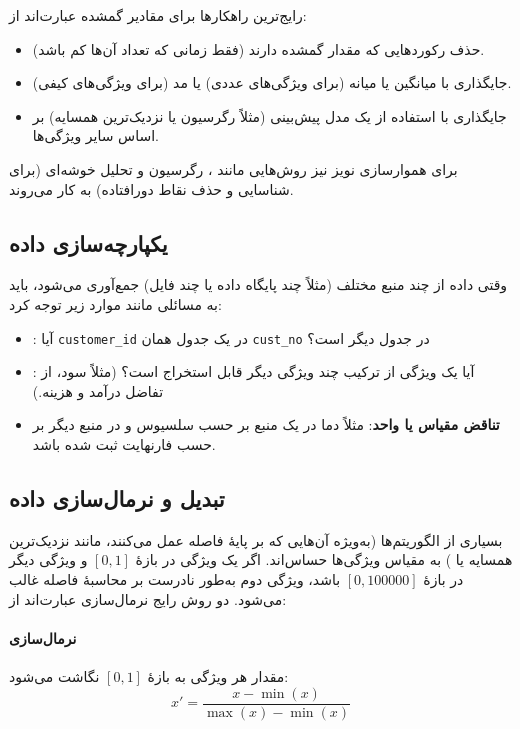 رایج‌ترین راهکارها برای مقادیر گمشده عبارت‌اند از:

\begin{itemize}
    \item حذف رکوردهایی که مقدار گمشده دارند (فقط زمانی که تعداد آن‌ها کم باشد).
    \item جایگذاری با میانگین یا میانه (برای ویژگی‌های عددی) یا مد (برای
          ویژگی‌های کیفی).
    \item جایگذاری با استفاده از یک مدل پیش‌بینی (مثلاً رگرسیون یا نزدیک‌ترین
          همسایه) بر اساس سایر ویژگی‌ها.
\end{itemize}

برای هموارسازی نویز نیز روش‌هایی مانند ،
رگرسیون و تحلیل خوشه‌ای (برای شناسایی و حذف نقاط دورافتاده) به کار می‌روند.

\subsection{یکپارچه‌سازی داده}

وقتی داده از چند منبع مختلف (مثلاً چند پایگاه داده یا چند فایل) جمع‌آوری
می‌شود، باید به مسائلی مانند موارد زیر توجه کرد:

\begin{itemize}
    \item {}: آیا
          \texttt{customer\_id} در یک جدول همان \texttt{cust\_no} در جدول
          دیگر است؟
    \item {}: آیا یک ویژگی از ترکیب چند ویژگی
          دیگر قابل استخراج است؟ (مثلاً سود، از تفاضل درآمد و هزینه.)
    \item \textbf{تناقض مقیاس یا واحد}: مثلاً دما در یک منبع بر حسب سلسیوس و
          در منبع دیگر بر حسب فارنهایت ثبت شده باشد.
\end{itemize}

\subsection{تبدیل و نرمال‌سازی داده}

بسیاری از الگوریتم‌ها (به‌ویژه آن‌هایی که بر پایهٔ فاصله عمل می‌کنند، مانند
نزدیک‌ترین همسایه یا ) به مقیاس ویژگی‌ها حساس‌اند. اگر یک ویژگی در
بازهٔ $[0, 1]$ و ویژگی دیگر در بازهٔ $[0, 100000]$ باشد، ویژگی دوم به‌طور
نادرست بر محاسبهٔ فاصله غالب می‌شود. دو روش رایج نرمال‌سازی عبارت‌اند از:

\paragraph{نرمال‌سازی }
مقدار هر ویژگی به بازهٔ $[0, 1]$ نگاشت می‌شود:
\[
x' = \frac{x - \min(x)}{\max(x) - \min(x)}
\]

